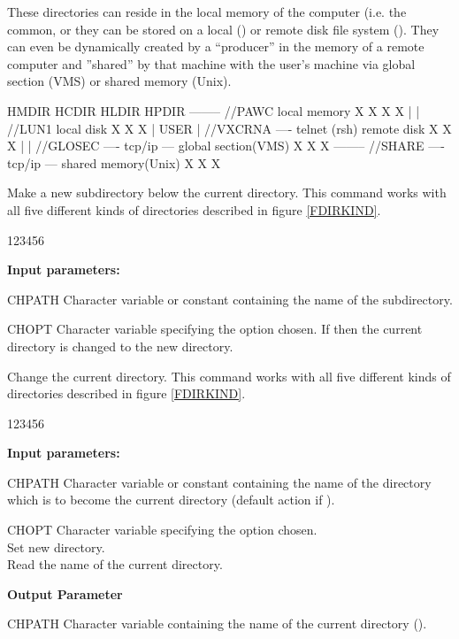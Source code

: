 These \HBOOK{} directories can reside in the local memory
of the computer (i.e. the  common,
or they can be stored on a local () or
remote disk file system ().
They can even be dynamically created by a ``producer'' in
the memory of a remote computer and ''shared'' by
that machine with the user's machine via global section (VMS)
or shared memory (Unix).

\begin{Fighere}
\begin{XMP}
                                                          HMDIR HCDIR HLDIR HPDIR
--------    //PAWC                     local memory         X     X     X     X
|      |    //LUN1                     local disk           X     X     X
| USER |    //VXCRNA ---- telnet (rsh) remote disk          X     X     X
|      |    //GLOSEC ---- tcp/ip ---   global section(VMS)  X     X     X
--------    //SHARE  ---- tcp/ip ---   shared memory(Unix)  X     X     X
\end{XMP}
\caption[Different kinds of HBOOK directories]%
        {Different kinds of \HBOOK{} directories}
\label{FDIRKIND}
\end{Fighere}

 
\Action
Make a new subdirectory below the current directory. 
This command works with all five different kinds of directories 
described in figure \ref{FDIRKIND}.
 
\begin{DLtt}{123456}
\item[{\rm\bf Input parameters:}]
\item[CHPATH] Character
variable or constant containing the name of the subdirectory.
\item[CHOPT] Character variable specifying the option chosen.
If  then the current directory is changed to the new
directory.
\end{DLtt}
 
\newpage%

 
\Action
Change the current directory.
This command works with all five different kinds of directories 
described in figure \ref{FDIRKIND}.
 
\begin{DLtt}{123456}
\item[{\rm\bf Input parameters:}]
\item[CHPATH] Character
variable or constant containing the name of the directory which
is to become the current directory (default action if ).
\item[CHOPT] Character variable specifying the option chosen.\\
 Set new directory.\\
 Read the name of the current directory.
\item[{\rm\bf Output Parameter}]
\item[CHPATH] Character
variable containing the name of the current directory ().
\end{DLtt}
 
